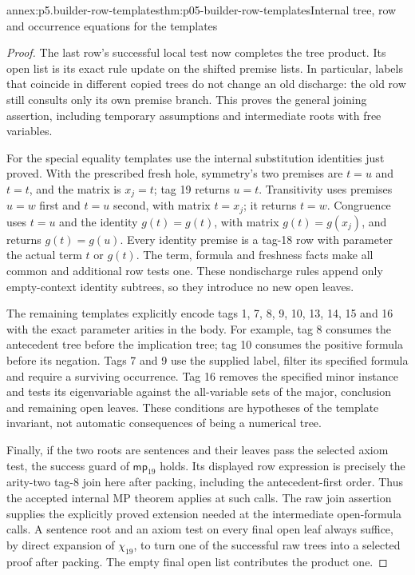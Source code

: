 \begin{annexitem}{annex:p5.builder-row-templates}{thm:p05-builder-row-templates}{Internal tree, row and occurrence equations for the templates}
\begin{proof}
The last row's successful local test now completes the tree product. Its
open list is its exact rule update on the shifted premise lists. In
particular, labels that coincide in different copied trees do not change
an old discharge: the old row still consults only its own premise branch.
This proves the general joining assertion, including temporary assumptions
and intermediate roots with free variables.

For the special equality templates use the internal substitution identities
just proved. With the prescribed fresh hole, symmetry's two premises are
\(t=u\) and \(t=t\), and the matrix is \(x_j=t\); tag 19 returns
\(u=t\). Transitivity uses premises \(u=w\) first and \(t=u\) second,
with matrix \(t=x_j\); it returns \(t=w\). Congruence uses \(t=u\)
and the identity \(g(t)=g(t)\), with matrix \(g(t)=g(x_j)\), and returns
\(g(t)=g(u)\). Every identity premise is a tag-18 row with parameter the
actual term \(t\) or \(g(t)\). The term, formula and freshness facts make
all common and additional row tests one. These nondischarge rules append
only empty-context identity subtrees, so they introduce no new open leaves.

The remaining templates explicitly encode tags 1, 7, 8, 9, 10, 13, 14, 15
and 16 with the exact parameter arities in the body. For example, tag 8
consumes the antecedent tree before the implication tree; tag 10 consumes
the positive formula before its negation. Tags 7 and 9 use the supplied
label, filter its specified formula and require a surviving occurrence.
Tag 16 removes the specified minor instance and tests its eigenvariable
against the all-variable sets of the major, conclusion and remaining open
leaves. These conditions are hypotheses of the template invariant, not
automatic consequences of being a numerical tree.

Finally, if the two roots are sentences and their leaves pass the selected
axiom test, the success guard of \(\mathsf{mp}_{19}\) holds. Its displayed
row expression is precisely the arity-two tag-8 join here after packing,
including the antecedent-first order. Thus the accepted internal MP theorem
applies at such calls. The raw join assertion supplies the explicitly proved
extension needed at the intermediate open-formula calls. A sentence root
and an axiom test on every final open leaf always suffice, by direct expansion
of \(\chi_{19}\), to turn one of the successful raw trees into a selected
proof after packing. The empty final open list contributes the product one.
\end{proof}
\end{annexitem}

